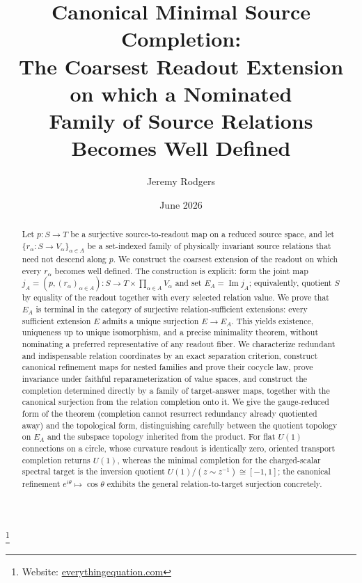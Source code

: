 \documentclass[11pt,reqno]{amsart}
\theoremstyle{plain}
\theoremstyle{definition}
\theoremstyle{remark}
\numberwithin{equation}{section}
\DeclareMathOperator{\Image}{Im}
\begin{document}
\title[Canonical Minimal Source Completion]{Canonical Minimal Source Completion:\\
The Coarsest Readout Extension on which a Nominated\\
Family of Source Relations Becomes Well Defined}

\author{Jeremy Rodgers}
\thanks{Website: \href{https://everythingequation.com}{everythingequation.com}}
\address{Independent Researcher}

\date{June 2026}



\begin{abstract}
Let $p\colon S\to T$ be a surjective source-to-readout map on a reduced source space, and let
$\{r_\alpha\colon S\to V_\alpha\}_{\alpha\in A}$ be a set-indexed family of physically invariant
source relations that need not descend along $p$. We construct the coarsest extension of the
readout on which every $r_\alpha$ becomes well defined. The construction is explicit: form the
joint map $j_A=(p,(r_\alpha)_{\alpha\in A})\colon S\to T\times\prod_{\alpha\in A}V_\alpha$ and
set $E_A=\Image j_A$; equivalently, quotient $S$ by equality of the readout together with every
selected relation value. We prove that $E_A$ is terminal in the category of surjective
relation-sufficient extensions: every sufficient extension $E$ admits a unique surjection
$E\to E_A$. This yields existence, uniqueness up to unique isomorphism, and a precise minimality
theorem, without nominating a preferred representative of any readout fiber. We characterize
redundant and indispensable relation coordinates by an exact separation criterion, construct
canonical refinement maps for nested families and prove their cocycle law, prove invariance under
faithful reparameterization of value spaces, and construct the completion determined directly by a
family of target-answer maps, together with the canonical surjection from the relation completion
onto it. We give the gauge-reduced form of the theorem (completion cannot resurrect redundancy
already quotiented away) and the topological form, distinguishing carefully between the quotient
topology on $E_A$ and the subspace topology inherited from the product. For flat $U(1)$ connections
on a circle, whose curvature readout is identically zero, oriented transport completion returns
$U(1)$, whereas the minimal completion for the charged-scalar spectral target is the inversion
quotient $U(1)/(z\sim z^{-1})\cong[-1,1]$; the canonical refinement $e^{i\theta}\mapsto\cos\theta$
exhibits the general relation-to-target surjection concretely.
\end{abstract}
\end{document}
